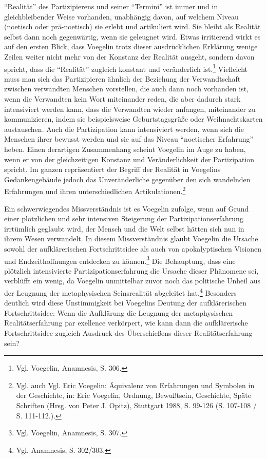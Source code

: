 "`Realität"' des Partizipierens und seiner "`Termini"' ist immer und in
gleichbleibender Weise vorhanden, unabhängig davon, auf welchem Niveau
(noetisch oder prä-noetisch) sie erlebt und artikuliert wird. Sie bleibt als
Realität selbst dann noch gegenwärtig, wenn sie geleugnet wird.  Etwas
irritierend wirkt es auf den ersten Blick, dass Voegelin trotz dieser
ausdrücklichen Erklärung wenige Zeilen weiter nicht mehr von der Konstanz der
Realität ausgeht, sondern davon spricht, dass die "`Realität"' zugleich
konstant und veränderlich ist.\footnote{Vgl. Voegelin, Anamnesis, S. 306.}
Vielleicht muss man sich das Partizipieren ähnlich der Beziehung der
Verwandtschaft zwischen verwandten Menschen vorstellen, die auch dann noch
vorhanden ist, wenn die Verwandten kein Wort miteinander reden, die aber
dadurch stark intensiviert werden kann, dass die Verwandten wieder anfangen,
miteinander zu kommunizieren, indem sie beispielsweise Geburtstagsgrüße oder
Weihnachtskarten austauschen. Auch die Partizipation kann intensiviert werden,
wenn sich die Menschen ihrer bewusst werden und sie auf das Niveau
"`noetischer Erfahrung"' heben.  Einen derartigen Zusammenhang scheint
Voegelin im Auge zu haben, wenn er von der gleichzeitigen Konstanz und
Veränderlichkeit der Partizipation spricht.  Im ganzen repräsentiert der
Begriff der Realität in Voegelins Gedankengebäude jedoch das Unveränderliche
gegenüber den sich wandelnden Erfahrungen und ihren unterschiedlichen
Artikulationen.\footnote{Vgl.  auch Vgl. Eric Voegelin: Äquivalenz von
  Erfahrungen und Symbolen in der Geschichte, in: Eric Voegelin, Ordnung,
  Bewußtsein, Geschichte, Späte Schriften (Hrsg. von Peter J. Opitz),
  Stuttgart 1988, S. 99-126 (S. 107-108 / S. 111-112.).}
 
Ein schwerwiegendes Missverständnis ist es Voegelin zufolge, wenn auf Grund
einer plötzlichen und sehr intensiven Steigerung der Partizipationserfahrung
irrtümlich geglaubt wird, der Mensch und die Welt selbst hätten sich nun in
ihrem Wesen verwandelt. In diesem Missverständnis glaubt Voegelin die Ursache
sowohl der aufklärerischen Fortschrittsidee als auch von apokalyptischen
Visionen und Endzeithoffnungen entdecken zu können.\footnote{Vgl. Voegelin,
  Anamnesis, S. 307.} Die Behauptung, dass eine plötzlich intensivierte
Partizipationserfahrung die Ursache dieser Phänomene sei, verblüfft ein wenig,
da Voegelin unmittelbar zuvor noch das politische Unheil aus der Leugnung der
metaphysischen Seinsrealität abgeleitet hat.\footnote{Vgl. Anamnesis,
  S. 302/303.} Besonders deutlich wird diese Unstimmigkeit bei Voegelins
Deutung der aufklärerischen Fortschrittsidee: Wenn die Aufklärung die Leugnung
der metaphysischen Realitätserfahrung par exellence verkörpert, wie kann dann
die aufklärerische Fortschrittsidee zugleich Ausdruck des Überschießens dieser
Realitätserfahrung sein?
 
